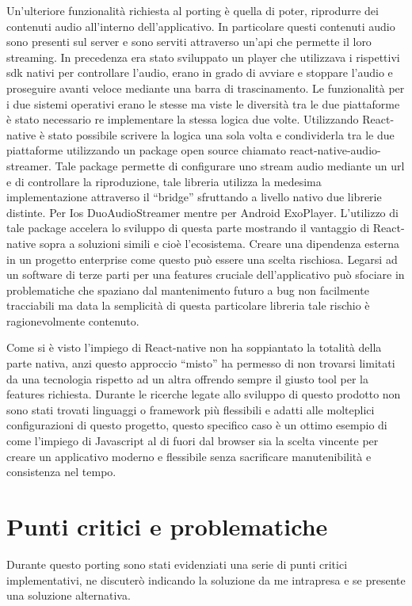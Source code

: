 Un'ulteriore funzionalità richiesta al porting è quella di poter, riprodurre dei contenuti audio all’interno dell’applicativo. In particolare questi contenuti audio sono presenti sul server e sono serviti attraverso un'api che permette il loro streaming. In precedenza era stato sviluppato un player che utilizzava i rispettivi sdk nativi per controllare l’audio, erano in grado di avviare e stoppare l’audio e proseguire avanti veloce mediante una barra di trascinamento. Le funzionalità per i due sistemi operativi erano le stesse ma viste le diversità tra le due piattaforme è stato necessario re implementare la stessa logica due volte. Utilizzando React-native è stato possibile scrivere la logica una sola volta e condividerla tra le due piattaforme utilizzando un package open source chiamato react-native-audio-streamer. Tale package permette di configurare uno stream audio mediante un url e di controllare la riproduzione, tale libreria utilizza la medesima implementazione attraverso il “bridge” sfruttando a livello nativo due librerie distinte. Per Ios DuoAudioStreamer mentre per Android ExoPlayer. L’utilizzo di tale package accelera lo sviluppo di questa parte mostrando il vantaggio di React-native sopra a soluzioni simili e cioè l’ecosistema. Creare una dipendenza esterna in un progetto enterprise come questo può essere una scelta rischiosa. Legarsi ad un software di terze parti per una features cruciale dell’applicativo può sfociare in problematiche che spaziano dal mantenimento futuro a bug non facilmente tracciabili ma data la semplicità di questa particolare libreria tale rischio è ragionevolmente contenuto.\vspace{5mm}

Come si è visto l’impiego di React-native non ha soppiantato la totalità della parte nativa, anzi questo approccio “misto” ha permesso di non trovarsi limitati da una tecnologia rispetto ad un altra offrendo sempre il giusto tool per la features richiesta. Durante le ricerche legate allo sviluppo di questo prodotto non sono stati trovati linguaggi o framework più flessibili e adatti alle molteplici configurazioni di questo progetto, questo specifico caso è un ottimo esempio di come l’impiego di Javascript al di fuori dal browser sia la scelta vincente per creare un applicativo moderno e flessibile senza sacrificare manutenibilità e consistenza nel tempo.\vspace{5mm}

\section{Punti critici e problematiche}
Durante questo porting sono stati evidenziati una serie di punti critici implementativi, ne discuterò indicando la soluzione da me intrapresa e se presente una soluzione alternativa.\vspace{5mm}


